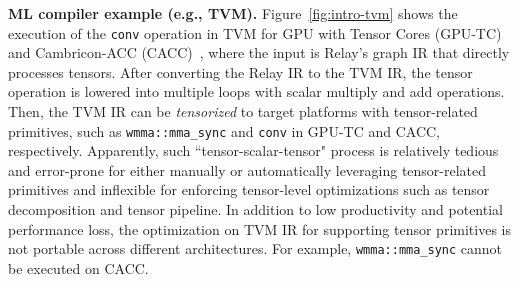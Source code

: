 \documentclass[pageno]{jpaper}
\begin{document}
\textbf{ML compiler example (e.g., TVM).} Figure~\ref{fig:intro-tvm} shows the execution of the \texttt{conv} operation in TVM for GPU with Tensor Cores (GPU-TC) and Cambricon-ACC (CACC)~\cite{chen2019instruction}, where the input is Relay's graph IR that directly processes tensors. After converting the Relay IR to the TVM IR, the tensor operation is lowered into multiple loops with scalar multiply and add operations. Then, the TVM IR can be \emph{tensorized} to target platforms with tensor-related primitives, such as \texttt{wmma::mma\_sync} and \texttt{conv} in GPU-TC and CACC, respectively. Apparently, such ``tensor-scalar-tensor" process is relatively tedious and error-prone for either manually or automatically leveraging tensor-related primitives and inflexible for enforcing tensor-level optimizations such as tensor decomposition and tensor pipeline. In addition to low productivity and potential performance loss, the optimization on TVM IR for supporting tensor primitives is not portable across different architectures. For example, \texttt{wmma::mma\_sync} cannot be executed on CACC. %

\end{document}
